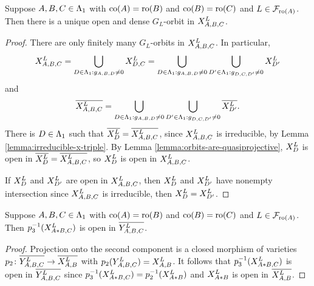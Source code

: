 \documentclass[a4paper, 11pt, twoside]{report}
\begin{document}
\begin{lemma}\label{lemma:generic-triple-product}
Suppose $A,B,C\in\matrices$ with $\co{A}=\ro{B}$ and $\co{B}=\ro{C}$ and $L\in\flags_{\ro{A}}$. Then there is a unique open and dense $G_L$-orbit in $\xprod[L]{A,B,C}$.
\end{lemma}

\begin{proof}
There are only finitely many $G_L$-orbits in $\xprod[L]{A,B,C}$. In particular,
\begin{equation*}
\xprod[L]{A,B,C}=\bigcup_{D\in\matrices:g_{A,B,D}\neq 0}\xprod[L]{D,C}=\bigcup_{D\in\matrices:g_{A,B,D}\neq 0}\bigcup_{D'\in\matrices: g_{D,C,D'}\neq 0}\xprod[L]{D'}
\end{equation*}
and
\begin{equation*}
\overline{\xprod[L]{A,B,C}} = \bigcup_{D\in\matrices: g_{A,B,D}\neq 0}\bigcup_{D'\in\matrices: g_{D,C,D'}\neq 0}\overline{\xprod[L]{D'}}.
\end{equation*}
There is $D\in\matrices$ such that $\overline{\xprod[L]{D}}=\overline{\xprod[L]{A,B,C}}$, since $\xprod[L]{A,B,C}$ is irreducible, by Lemma \ref{lemma:irreducible-x-triple}. By Lemma \ref{lemma:orbits-are-quasiprojective}, $\xprod[L]{D}$ is open in $\overline{\xprod[L]{D}}=\overline{\xprod[L]{A,B,C}}$, so $\xprod[L]{D}$ is open in $\xprod[L]{A,B,C}$.

If $\xprod[L]{D}$ and $\xprod[L]{D'}$ are open in $\xprod[L]{A,B,C}$, then $\xprod[L]{D}$ and $\xprod[L]{D'}$ have nonempty intersection since $\xprod[L]{A,B,C}$ is irreducible, then $\xprod[L]{D}=\xprod[L]{D'}$.
\end{proof}

\begin{lemma}\label{lemma:yprod-generic-A-B}
Suppose $A,B,C\in\matrices$ with $\co{A}=\ro{B}$ and $\co{B}=\ro{C}$ and $L\in\flags_{\ro{A}}$. Then $p_3^{-1}(\xprod[L]{A\ast B,C})$ is open in $\overline{\yprod[L]{A,B,C}}$.
\end{lemma}

\begin{proof}
Projection onto the second component is a closed morphism of varieties $p_2\colon\overline{\yprod[L]{A,B,C}}\to\overline{\xprod[L]{A,B}}$ with $p_2(\yprod[L]{A,B,C})=\xprod[L]{A,B}$. It follows that $p_3^{-1}(\xprod[L]{A\ast B,C})$ is open in $\overline{\yprod[L]{A,B,C}}$ since $p_3^{-1}(\xprod[L]{A\ast B,C})=p_2^{-1}(\xprod[L]{A\ast B})$ and $\xprod[L]{A\ast B}$ is open in $\overline{\xprod[L]{A,B}}$.
\end{proof}
\end{document}
